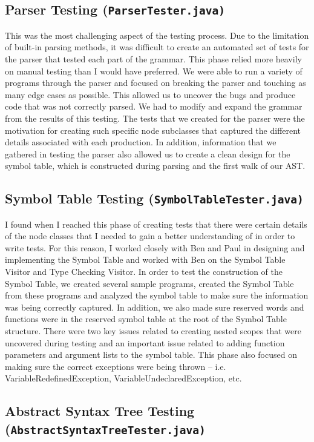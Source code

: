 \documentclass{report}
\begin{document}
\subsection*{Parser Testing (\tt ParserTester.java\rm)}

This was the most challenging aspect of the testing process. Due to the limitation of built-in parsing methods, it was difficult to create an automated set of tests for the parser that tested each part of the grammar. This phase relied more heavily on manual testing than I would have preferred. We were able to run a variety of programs through the parser and focused on breaking the parser and touching as many edge cases as possible. This allowed us to uncover the bugs and produce code that was not correctly parsed. We had to modify and expand the grammar from the results of this testing. The tests that we created for the parser were the motivation for creating such specific node subclasses that captured the different details associated with each production. In addition, information that we gathered in testing the parser also allowed us to create a clean design for the symbol table, which is constructed during parsing and the first walk of our AST.

\subsection*{Symbol Table Testing (\tt SymbolTableTester.java\rm)}
I found when I reached this phase of creating tests that there were certain details of the node classes that I needed to gain a better understanding of in order to write tests. For this reason, I worked closely with Ben and Paul in designing and implementing the Symbol Table and worked with Ben on the Symbol Table Visitor and Type Checking Visitor. In order to test the construction of the Symbol Table, we created several sample programs, created the Symbol Table from these programs and analyzed the symbol table to make sure the information was being correctly captured. In addition, we also made sure reserved words and functions were in the reserved symbol table at the root of the Symbol Table structure. There were two key issues related to creating nested scopes that were uncovered during testing and an important issue related to adding function parameters and argument lists to the symbol table. This phase also focused on making sure the correct exceptions were being thrown – i.e. VariableRedefinedException, VariableUndeclaredException, etc.

\subsection*{Abstract Syntax Tree Testing (\tt AbstractSyntaxTreeTester.java\rm)}
\end{document}
